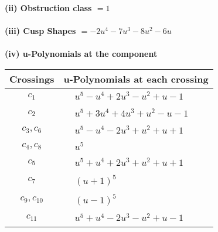 \documentclass[1p]{elsarticle_modified}
\theoremstyle{definition}
\begin{document}
\flushleft \textbf{(ii) Obstruction class $= 1$}\\~\\
\flushleft \textbf{(iii) Cusp Shapes $= -2 u^4-7 u^3-8 u^2-6 u$}\\~\\
\newpage\renewcommand{\arraystretch}{1}
\flushleft \textbf{(iv) u-Polynomials at the component}\newline \\
\begin{tabular}{m{50pt}|m{274pt}}
Crossings & \hspace{64pt}u-Polynomials at each crossing \\
\hline $$\begin{aligned}c_{1}\end{aligned}$$&$\begin{aligned}
&u^5- u^4+2 u^3- u^2+u-1
\end{aligned}$\\
\hline $$\begin{aligned}c_{2}\end{aligned}$$&$\begin{aligned}
&u^5+3 u^4+4 u^3+u^2- u-1
\end{aligned}$\\
\hline $$\begin{aligned}c_{3},c_{6}\end{aligned}$$&$\begin{aligned}
&u^5- u^4-2 u^3+u^2+u+1
\end{aligned}$\\
\hline $$\begin{aligned}c_{4},c_{8}\end{aligned}$$&$\begin{aligned}
&u^5
\end{aligned}$\\
\hline $$\begin{aligned}c_{5}\end{aligned}$$&$\begin{aligned}
&u^5+u^4+2 u^3+u^2+u+1
\end{aligned}$\\
\hline $$\begin{aligned}c_{7}\end{aligned}$$&$\begin{aligned}
&(u+1)^5
\end{aligned}$\\
\hline $$\begin{aligned}c_{9},c_{10}\end{aligned}$$&$\begin{aligned}
&(u-1)^5
\end{aligned}$\\
\hline $$\begin{aligned}c_{11}\end{aligned}$$&$\begin{aligned}
&u^5+u^4-2 u^3- u^2+u-1
\end{aligned}$\\
\hline
\end{tabular}\\~\\
\end{document}
